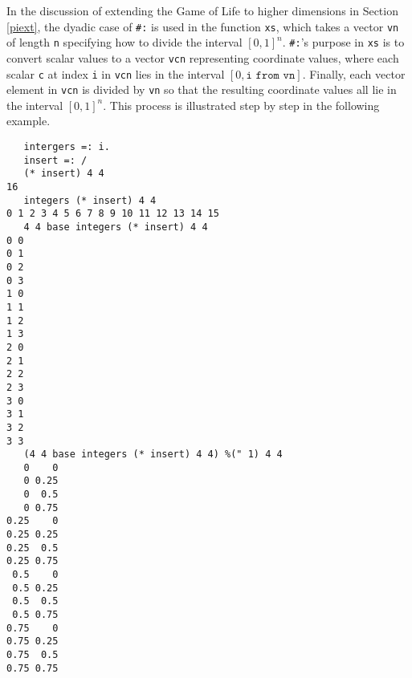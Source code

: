 In the discussion of extending the Game of Life to higher dimensions in Section \ref{piext}, 
the dyadic case of \texttt{\#:} is used in the function \texttt{xs}, 
which takes a vector \texttt{vn} of length \texttt{n} specifying how to divide the interval $[0,1]^n$. 
\texttt{\#:}'s purpose in \texttt{xs} is to convert scalar values to 
a vector \texttt{vcn} representing coordinate values, where each scalar \texttt{c} at index \texttt{i} in 
\texttt{vcn} lies in the interval $[0, \texttt{i from vn}]$.
Finally, each vector element in \texttt{vcn} is divided by \texttt{vn} so that the resulting coordinate values 
all lie in the interval $[0,1]^n$.
This process is illustrated step by step in the following example.

\begin{singlespacing}
\begin{small}
\begin{verbatim}
   intergers =: i.
   insert =: /
   (* insert) 4 4
16
   integers (* insert) 4 4
0 1 2 3 4 5 6 7 8 9 10 11 12 13 14 15
   4 4 base integers (* insert) 4 4
0 0
0 1
0 2
0 3
1 0
1 1
1 2
1 3
2 0
2 1
2 2
2 3
3 0
3 1
3 2
3 3
   (4 4 base integers (* insert) 4 4) %(" 1) 4 4
   0    0
   0 0.25
   0  0.5
   0 0.75
0.25    0
0.25 0.25
0.25  0.5
0.25 0.75
 0.5    0
 0.5 0.25
 0.5  0.5
 0.5 0.75
0.75    0
0.75 0.25
0.75  0.5
0.75 0.75
\end{verbatim}
\end{small}
\end{singlespacing}
